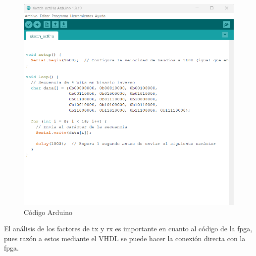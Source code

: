 \documentclass[osajnl,twocolumn,showpacs,superscriptaddress,10pt]{revtex4-1}
\begin{document}
\begin{figure}[H]
    \centering
    \includegraphics[scale=0.4]{images/codex ardui.png}
    \caption{Código Arduino}
\end{figure}

El análisis de los factores de tx y rx es importante en cuanto al código de la fpga, pues razón a estos mediante el VHDL se puede hacer la conexión directa con la fpga. 
\end{document}
